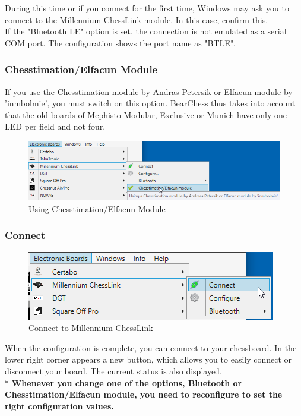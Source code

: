 \documentclass[11pt,a4paper]{article}
\begin{document}
During this time or if you connect for the first time, Windows may ask you to connect to the Millennium ChessLink module. In this case, confirm this.\\

If the "Bluetooth LE" option is set, the connection is not emulated as a serial COM port. The configuration shows the port name as "BTLE".

\subsubsection{Chesstimation/Elfacun Module}
If you use the Chesstimation module by Andras Petersik or Elfacun module by 'inmbolmie', you must switch on this option.
BearChess thus takes into account that the old boards of Mephisto Modular, Exclusive or Munich have only one LED per field and not four.
\begin{figure}[H]
	\centering
	\includegraphics[scale=0.6]{MillenniumChessLink13.png}
	\caption{Using Chesstimation/Elfacun Module}
	\label{fig:MillenniumChessLink13}
\end{figure}


\subsubsection{Connect}
\begin{figure}[H]
	\centering
	\includegraphics[scale=1.0]{MillenniumChessLink6.png}
	\caption{Connect to Millennium ChessLink}
	\label{fig:MillenniumChessLink6}
\end{figure}
When the configuration is complete, you can connect to your chessboard.
In the lower right corner appears a new button, which allows you to easily connect or disconnect your board. The current status is also displayed.\\
{\color{red}*}\textbf{ Whenever you change one of the options, Bluetooth or Chesstimation/Elfacun module, you need to reconfigure to set the right configuration values.}
\end{document}
